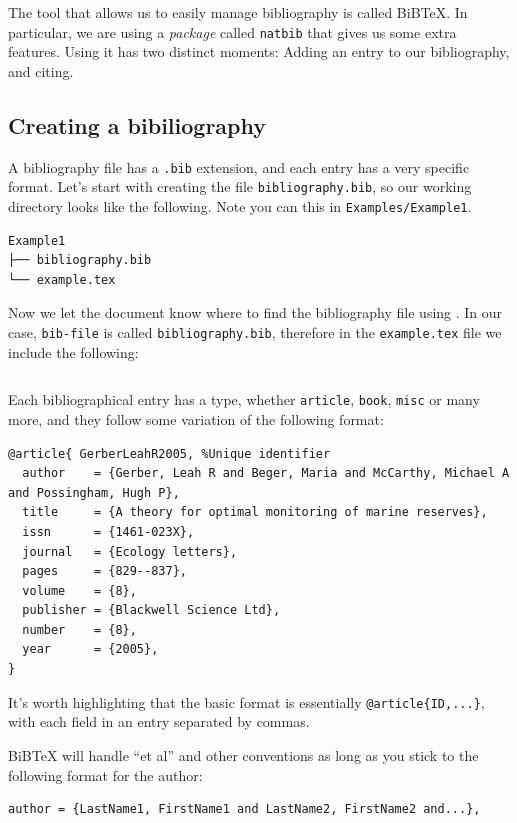The tool that allows us to easily manage bibliography is called BiBTeX. In particular, we are using a \emph{package} called \verb|natbib| that gives us some extra features.
Using it has two distinct moments: Adding an entry to our bibliography, and citing.

\subsection{Creating a bibiliography}
A bibliography file has a \verb|.bib| extension, and each entry has a very specific format.
Let's start with creating the file \verb|bibliography.bib|, so our working directory looks like the following.
Note you can this in \texttt{Examples/Example1}.
\begin{verbatim}
Example1
├── bibliography.bib
└── example.tex
\end{verbatim}

Now we let the document know where to find the bibliography file using \verb||.
In our case, \texttt{bib-file} is called \verb|bibliography.bib|, therefore in the \texttt{example.tex} file we include the following:
\begin{lstlisting}

\end{lstlisting}

Each bibliographical entry has a type, whether \verb|article|, \verb|book|, \verb|misc| or many more, and they follow some variation of the following format:
\begin{lstlisting}
@article{ GerberLeahR2005, %Unique identifier
  author    = {Gerber, Leah R and Beger, Maria and McCarthy, Michael A and Possingham, Hugh P},
  title     = {A theory for optimal monitoring of marine reserves},
  issn      = {1461-023X},
  journal   = {Ecology letters},
  pages     = {829--837},
  volume    = {8},
  publisher = {Blackwell Science Ltd},
  number    = {8},
  year      = {2005},
}
\end{lstlisting}

It's worth highlighting that the basic format is essentially \verb|@article{ID,...}|, with each field in an entry separated by commas.

BiBTeX will handle ``et al'' and other conventions as long as you stick to the following format for the author:
\begin{lstlisting}
author = {LastName1, FirstName1 and LastName2, FirstName2 and...},
\end{lstlisting}

